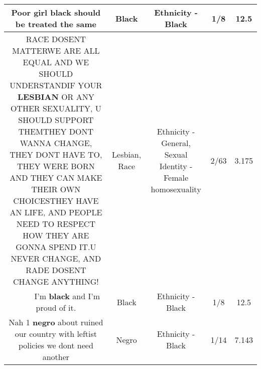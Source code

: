 \documentclass[11pt]{article}
\newlength\mylength
\begin{document}
\begin{center}
\begin{longtable}{|C{.65\mylength}|C{.30\mylength}|C{.12\mylength}|C{.12\mylength}|C{.12\mylength}|}
  \small Poor girl \textbf{black} should be treated the same\normalsize   & Black & Ethnicity - Black & 1/8 & 12.5 \\  \hline
  \small RACE DOSENT MATTERWE ARE ALL EQUAL AND WE SHOULD UNDERSTANDIF YOUR \textbf{LESBIAN} OR ANY OTHER SEXUALITY, U SHOULD SUPPORT THEMTHEY DONT WANNA CHANGE, THEY DONT HAVE TO, THEY WERE BORN AND THEY CAN MAKE THEIR OWN CHOICESTHEY HAVE AN LIFE, AND PEOPLE NEED TO RESPECT HOW THEY ARE GONNA SPEND IT.U NEVER CHANGE, AND RADE DOSENT CHANGE ANYTHING!\normalsize   & Lesbian, Race & Ethnicity - General, Sexual Identity - Female homosexuality & 2/63 & 3.175 \\  \hline
  \small 👏👏👏👏👏👏👏👏👏👏I'm \textbf{black} and I'm proud of it.\normalsize   & Black & Ethnicity - Black & 1/8 & 12.5 \\  \hline
  \small Nah 1 \textbf{negro} about ruined our country with leftist policies we dont need another\normalsize   & Negro & Ethnicity - Black & 1/14 & 7.143 \\  \hline

\end{longtable}
\end{center}
\end{document}
